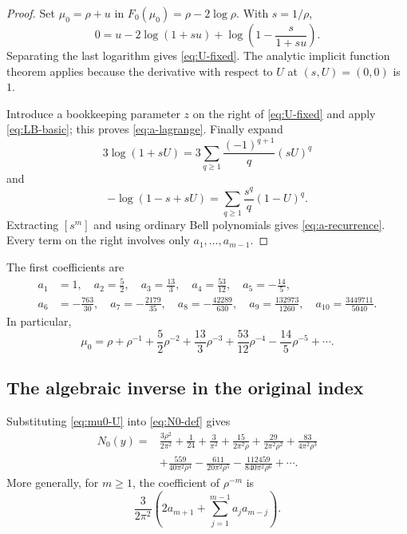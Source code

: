 \documentclass[11pt,a4paper]{article}
\numberwithin{equation}{section}
\theoremstyle{definition}
\theoremstyle{remark}
\begin{document}
\begin{proof}
Set $\mu_0=\rho+u$ in $F_0(\mu_0)=\rho-2\log\rho$.  With $s=1/\rho$,
\[
 0=u-2\log(1+su)+\log\left(1-\frac{s}{1+su}\right).
\]
Separating the last logarithm gives \eqref{eq:U-fixed}.  The analytic implicit
function theorem applies because the derivative with respect to $U$ at
$(s,U)=(0,0)$ is $1$.

Introduce a bookkeeping parameter $z$ on the right of \eqref{eq:U-fixed} and
apply \eqref{eq:LB-basic}; this proves \eqref{eq:a-lagrange}.  Finally expand
\[
 3\log(1+sU)=3\sum_{q\geq1}\frac{(-1)^{q+1}}q(sU)^q
\]
and
\[
 -\log(1-s+sU)=\sum_{q\geq1}\frac{s^q}{q}(1-U)^q.
\]
Extracting $[s^m]$ and using ordinary Bell polynomials gives
\eqref{eq:a-recurrence}.  Every term on the right involves only
$a_1,\ldots,a_{m-1}$.
\end{proof}

The first coefficients are
\begin{equation}\label{eq:a-table-inline}
\begin{split}
 a_1&=1,\quad a_2=\frac52,\quad a_3=\frac{13}{3},\quad
 a_4=\frac{53}{12},\quad a_5=-\frac{14}{5},\\
 a_6&=-\frac{763}{30},\quad a_7=-\frac{2179}{35},\quad
 a_8=-\frac{42289}{630},\quad a_9=\frac{132973}{1260},\quad
 a_{10}=\frac{3449711}{5040}.
\end{split}
\end{equation}
In particular,
\begin{equation}\label{eq:mu0-explicit}
 \mu_0=\rho+\rho^{-1}+\frac52\rho^{-2}
 +\frac{13}{3}\rho^{-3}+\frac{53}{12}\rho^{-4}
 -\frac{14}{5}\rho^{-5}+\cdots.
\end{equation}

\subsection{The algebraic inverse in the original index}

Substituting \eqref{eq:mu0-U} into \eqref{eq:N0-def} gives
\begin{align}
 N_0(y)
 ={}&\frac{3\rho^2}{2\pi^2}+\frac1{24}+\frac3{\pi^2}
 +\frac{15}{2\pi^2\rho}
 +\frac{29}{2\pi^2\rho^2}
 +\frac{83}{4\pi^2\rho^3}
 \label{eq:N0-rho}\\
 &+\frac{559}{40\pi^2\rho^4}
 -\frac{611}{20\pi^2\rho^5}
 -\frac{112459}{840\pi^2\rho^6}+\cdots.
 \nonumber
\end{align}
More generally, for $m\geq1$, the coefficient of $\rho^{-m}$ is
\begin{equation}\label{eq:N0-general-coeff}
 \frac{3}{2\pi^2}
 \left(2a_{m+1}+\sum_{j=1}^{m-1}a_ja_{m-j}\right).
\end{equation}
\end{document}
